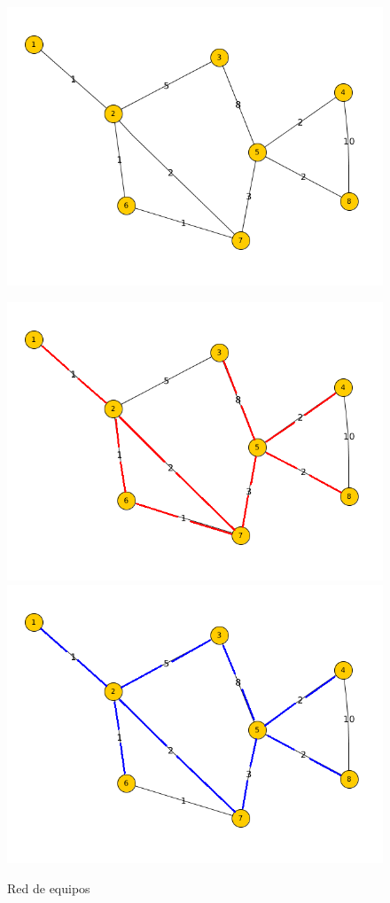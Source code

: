 \documentclass[11pt, a4paper, twoside]{article}
\begin{document}
\begin{figure}[H]
\includegraphics[scale=1]{imagenes/equipos2.png}
\caption{Red de equipos}
\includegraphics[scale=1]{imagenes/equipos3.png}
\includegraphics[scale=1]{imagenes/equipos4.png}

\end{figure}
\end{document}
